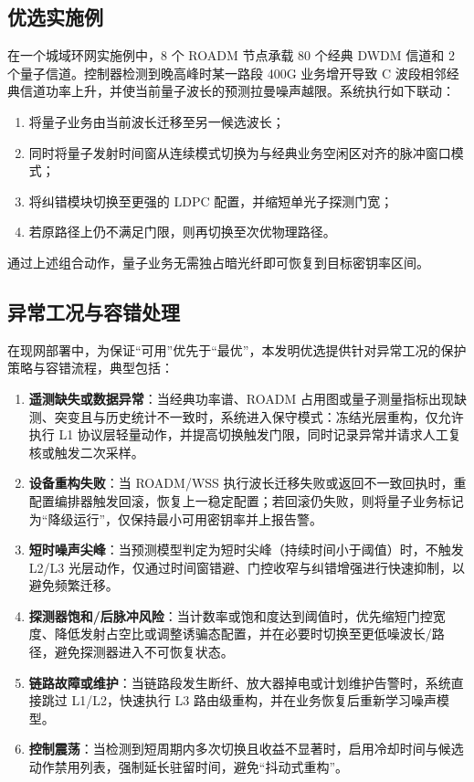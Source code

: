\documentclass[12pt,a4paper]{article}
\begin{document}
\subsection{优选实施例}

在一个城域环网实施例中，8 个 ROADM 节点承载 80 个经典 DWDM 信道和 2 个量子信道。控制器检测到晚高峰时某一路段 400G 业务增开导致 C 波段相邻经典信道功率上升，并使当前量子波长的预测拉曼噪声越限。系统执行如下联动：
\begin{enumerate}[label=(\arabic*)]
    \item 将量子业务由当前波长迁移至另一候选波长；
    \item 同时将量子发射时间窗从连续模式切换为与经典业务空闲区对齐的脉冲窗口模式；
    \item 将纠错模块切换至更强的 LDPC 配置，并缩短单光子探测门宽；
    \item 若原路径上仍不满足门限，则再切换至次优物理路径。
\end{enumerate}

通过上述组合动作，量子业务无需独占暗光纤即可恢复到目标密钥率区间。

\subsection{异常工况与容错处理}

在现网部署中，为保证“可用”优先于“最优”，本发明优选提供针对异常工况的保护策略与容错流程，典型包括：
\begin{enumerate}[label=(\arabic*)]
    \item \textbf{遥测缺失或数据异常}：当经典功率谱、ROADM 占用图或量子测量指标出现缺测、突变且与历史统计不一致时，系统进入保守模式：冻结光层重构，仅允许执行 L1 协议层轻量动作，并提高切换触发门限，同时记录异常并请求人工复核或触发二次采样。
    \item \textbf{设备重构失败}：当 ROADM/WSS 执行波长迁移失败或返回不一致回执时，重配置编排器触发回滚，恢复上一稳定配置；若回滚仍失败，则将量子业务标记为“降级运行”，仅保持最小可用密钥率并上报告警。
    \item \textbf{短时噪声尖峰}：当预测模型判定为短时尖峰（持续时间小于阈值）时，不触发 L2/L3 光层动作，仅通过时间窗错避、门控收窄与纠错增强进行快速抑制，以避免频繁迁移。
    \item \textbf{探测器饱和/后脉冲风险}：当计数率或饱和度达到阈值时，优先缩短门控宽度、降低发射占空比或调整诱骗态配置，并在必要时切换至更低噪波长/路径，避免探测器进入不可恢复状态。
    \item \textbf{链路故障或维护}：当链路段发生断纤、放大器掉电或计划维护告警时，系统直接跳过 L1/L2，快速执行 L3 路由级重构，并在业务恢复后重新学习噪声模型。
    \item \textbf{控制震荡}：当检测到短周期内多次切换且收益不显著时，启用冷却时间与候选动作禁用列表，强制延长驻留时间，避免“抖动式重构”。
\end{enumerate}
\end{document}
